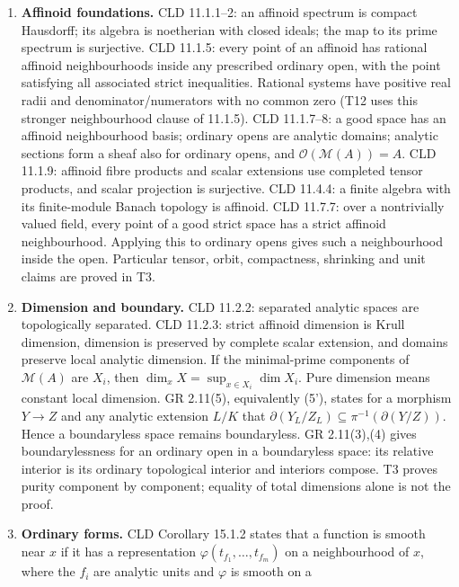 \documentclass[
  10pt,
]{article}
\begin{document}
\begin{enumerate}
\def\labelenumi{\arabic{enumi}.}
\item
  \textbf{Affinoid foundations.} CLD 11.1.1--2: an affinoid spectrum is
  compact Hausdorff; its algebra is noetherian with closed ideals; the
  map to its prime spectrum is surjective. CLD 11.1.5: every point of an
  affinoid has rational affinoid neighbourhoods inside any prescribed
  ordinary open, with the point satisfying all associated strict
  inequalities. Rational systems have positive real radii and
  denominator/numerators with no common zero (T12 uses this stronger
  neighbourhood clause of 11.1.5). CLD 11.1.7--8: a good space has an
  affinoid neighbourhood basis; ordinary opens are analytic domains;
  analytic sections form a sheaf also for ordinary opens, and
  \(\mathcal O(\mathcal M(A))=A\). CLD 11.1.9: affinoid fibre products
  and scalar extensions use completed tensor products, and scalar
  projection is surjective. CLD 11.4.4: a finite algebra with its
  finite-module Banach topology is affinoid. CLD 11.7.7: over a
  nontrivially valued field, every point of a good strict space has a
  strict affinoid neighbourhood. Applying this to ordinary opens gives
  such a neighbourhood inside the open. Particular tensor, orbit,
  compactness, shrinking and unit claims are proved in T3.
\item
  \textbf{Dimension and boundary.} CLD 11.2.2: separated analytic spaces
  are topologically separated. CLD 11.2.3: strict affinoid dimension is
  Krull dimension, dimension is preserved by complete scalar extension,
  and domains preserve local analytic dimension. If the minimal-prime
  components of \(\mathcal M(A)\) are \(X_i\), then
  \(\dim_xX=\sup_{x\in X_i}\dim X_i\). Pure dimension means constant
  local dimension. GR 2.11(5), equivalently (5'), states for a morphism
  \(Y\to Z\) and any analytic extension \(L/K\) that
  \(\partial(Y_L/Z_L)\subseteq\pi^{-1}(\partial(Y/Z))\). Hence a
  boundaryless space remains boundaryless. GR 2.11(3),(4) gives
  boundarylessness for an ordinary open in a boundaryless space: its
  relative interior is its ordinary topological interior and interiors
  compose. T3 proves purity component by component; equality of total
  dimensions alone is not the proof.
\item
  \textbf{Ordinary forms.} CLD Corollary 15.1.2 states that a function
  is smooth near \(x\) if it has a representation
  \(\varphi(t_{f_1},\ldots,t_{f_m})\) on a neighbourhood of \(x\), where
  the \(f_i\) are analytic units and \(\varphi\) is smooth on a

\end{enumerate}
\end{document}
